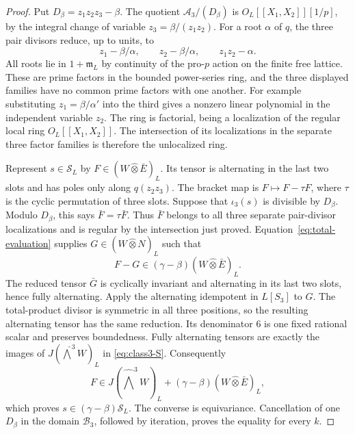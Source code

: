 \begin{proof}
Put $D_\beta=z_1z_2z_3-\beta$.
The quotient $\mathcal A_3/(D_\beta)$ is
$O_L[[X_1,X_2]][1/p]$, by the integral change of
variable $z_3=\beta/(z_1z_2)$. For a root $\alpha$ of $q$,
the three pair divisors reduce, up to units, to
\[
 z_1-\beta/\alpha,\qquad z_2-\beta/\alpha,\qquad
                                  z_1z_2-\alpha.
\]
All roots lie in $1+\mathfrak m_L$ by continuity of the
pro-$p$ action on the finite free lattice.
These are prime factors in the bounded power-series
ring, and the three displayed families have no common
prime factors with one another. For example substituting
$z_1=\beta/\alpha'$ into the third gives a nonzero linear
polynomial in the independent variable $z_2$.
The ring is factorial, being a localization of the
regular local ring $O_L[[X_1,X_2]]$.
The intersection of its localizations in the separate
three factor families is therefore the unlocalized ring.

Represent $s\in\mathcal S_L$ by
$F\in(W\widehat\otimes\bar E)_L$.
Its tensor is alternating in the last two slots and
has poles only along $q(z_2z_3)$.
The bracket map is $F\mapsto F-\tau F$, where
$\tau$ is the cyclic permutation of three slots.
Suppose that $\iota_3(s)$ is divisible by $D_\beta$.
Modulo $D_\beta$, this says $\bar F=\tau\bar F$.
Thus $\bar F$ belongs to all three separate pair-divisor
localizations and is regular by the intersection just proved.
Equation~\eqref{eq:total-evaluation} supplies
$G\in(W\widehat\otimes N)_L$ such that
\[
 F-G\in(\gamma-\beta)(W\widehat\otimes\bar E)_L.
\]
The reduced tensor $\bar G$ is cyclically invariant and
alternating in its last two slots, hence fully alternating.
Apply the alternating idempotent in $L[S_3]$ to $G$.
The total-product divisor is symmetric in all three
positions, so the resulting alternating tensor has the
same reduction. Its denominator $6$ is one fixed rational
scalar and preserves boundedness. Fully alternating
tensors are exactly the images of
$J(\widehat{\bigwedge}^3W)_L$ in
\eqref{eq:class3-S}. Consequently
\[
 F\in J(\widehat{\bigwedge}^3W)_L
             +(\gamma-\beta)(W\widehat\otimes\bar E)_L,
\]
which proves $s\in(\gamma-\beta)\mathcal S_L$.
The converse is equivariance. Cancellation of one
$D_\beta$ in the domain $\mathcal B_3$, followed by
iteration, proves the equality for every $k$.
\end{proof}


